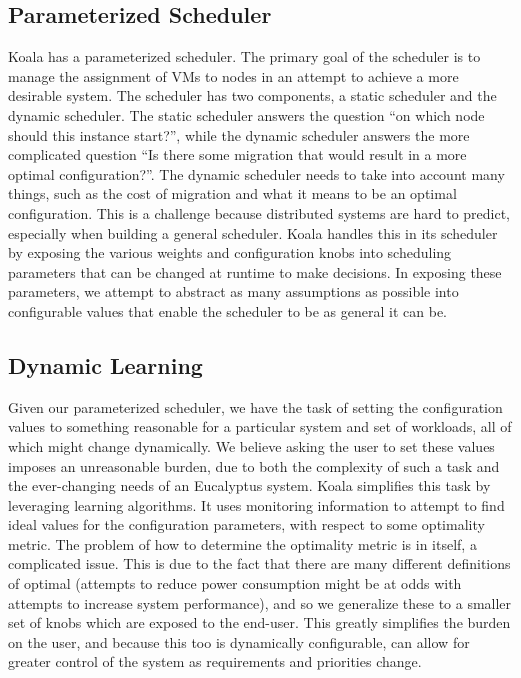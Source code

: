 \subsection{Parameterized Scheduler}
Koala has a parameterized scheduler.  The primary goal of the scheduler is to
manage the assignment of VMs to nodes in an attempt to achieve a more desirable
system.  The scheduler has two components, a static scheduler and the dynamic
scheduler.  The static scheduler answers the question ``on which node should
this instance start?'', while the dynamic scheduler answers the more
complicated question ``Is there some migration that would result in a more
optimal configuration?''.  The dynamic scheduler needs to take into account
many things, such as the cost of migration and what it means to be an optimal
configuration.  This is a challenge because distributed systems are hard to
predict, especially when building a general scheduler.  Koala handles this in
its scheduler by exposing the various weights and configuration knobs into
scheduling parameters that can be changed at runtime to make decisions.  In
exposing these parameters, we attempt to abstract as many assumptions as
possible into configurable values that enable the scheduler to be as general it
can be.

\subsection{Dynamic Learning}
Given our parameterized scheduler, we have the task of setting the
configuration values to something reasonable for a particular system and set of
workloads, all of which might change dynamically.  We believe asking the user
to set these values imposes an unreasonable burden, due to both the complexity
of such a task and the ever-changing needs of an Eucalyptus system.  Koala
simplifies this task by leveraging learning algorithms.  It uses monitoring
information to attempt to find ideal values for the configuration parameters,
with respect to some optimality metric.  The problem of how to determine the
optimality metric is in itself, a complicated issue.  This is due to the fact
that there are many different definitions of optimal (attempts to reduce power
consumption might be at odds with attempts to increase system performance), and
so we generalize these to a smaller set of knobs which are exposed to the
end-user.  This greatly simplifies the burden on the user, and because this too
is dynamically configurable, can allow for greater control of the system as
requirements and priorities change.

